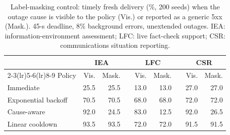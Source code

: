 \begin{table}[t]
\centering
\caption{Label-masking control: timely fresh delivery (\%, 200 seeds) when the outage cause is visible to the policy (Vis.) or reported as a generic 5xx (Mask.). 45-s deadline, 8\% background errors, unextended outages. IEA: information-environment assessment; LFC: live fact-check support; CSR: communications situation reporting.}
\label{tab:mask}
\scriptsize
\setlength{\tabcolsep}{3.5pt}
\begin{tabular}{@{}lrrcrrcrr@{}}\toprule
 & \multicolumn{2}{c}{IEA} && \multicolumn{2}{c}{LFC} && \multicolumn{2}{c}{CSR}\\
\cmidrule(lr){2-3}\cmidrule(lr){5-6}\cmidrule(lr){8-9}
Policy & Vis. & Mask. && Vis. & Mask. && Vis. & Mask.\\\midrule
Immediate & 25.5 & 25.5 && 13.0 & 13.0 && 27.0 & 27.0\\
Exponential backoff & 70.5 & 70.5 && 68.0 & 68.0 && 72.0 & 72.0\\
Cause-aware & 92.0 & 24.5 && 83.0 & 12.5 && 92.0 & 26.5\\
Linear cooldown & 93.5 & 93.5 && 72.0 & 72.0 && 91.5 & 91.5\\\bottomrule
\end{tabular}
\end{table}
